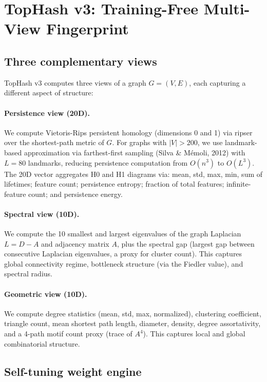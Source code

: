 \documentclass[11pt]{article}
\begin{document}
\section{TopHash v3: Training-Free Multi-View Fingerprint}

\subsection{Three complementary views}

TopHash v3 computes three views of a graph $G = (V, E)$, each capturing a different aspect of structure:

\paragraph{Persistence view (20D).} We compute Vietoris-Rips persistent homology (dimensions 0 and 1) via ripser over the shortest-path metric of $G$. For graphs with $|V| > 200$, we use landmark-based approximation via farthest-first sampling (Silva \& M\'emoli, 2012) with $L = 80$ landmarks, reducing persistence computation from $O(n^3)$ to $O(L^3)$. The 20D vector aggregates H0 and H1 diagrams via: mean, std, max, min, sum of lifetimes; feature count; persistence entropy; fraction of total features; infinite-feature count; and persistence energy.

\paragraph{Spectral view (10D).} We compute the 10 smallest and largest eigenvalues of the graph Laplacian $L = D - A$ and adjacency matrix $A$, plus the spectral gap (largest gap between consecutive Laplacian eigenvalues, a proxy for cluster count). This captures global connectivity regime, bottleneck structure (via the Fiedler value), and spectral radius.

\paragraph{Geometric view (10D).} We compute degree statistics (mean, std, max, normalized), clustering coefficient, triangle count, mean shortest path length, diameter, density, degree assortativity, and a 4-path motif count proxy (trace of $A^4$). This captures local and global combinatorial structure.

\subsection{Self-tuning weight engine}
\end{document}

